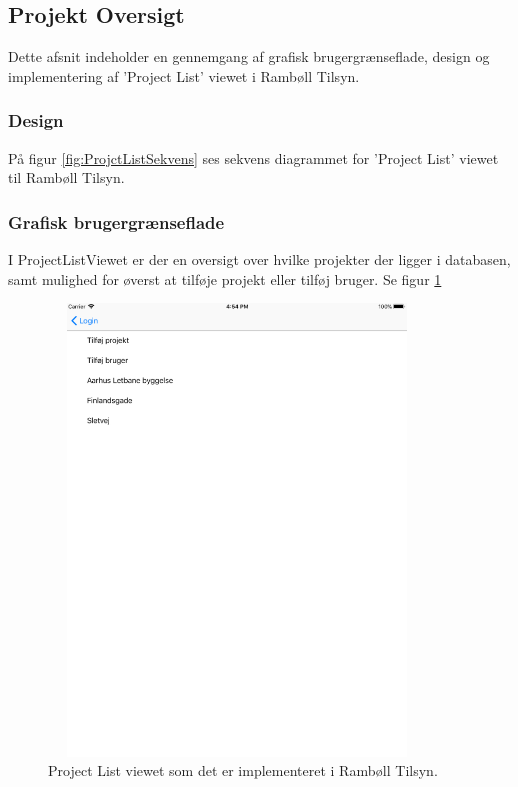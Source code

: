 \subsection{Projekt Oversigt} \label{sec:ProjectList}
Dette afsnit indeholder en gennemgang af grafisk brugergrænseflade, design og implementering af 'Project List' viewet i Rambøll Tilsyn.

\subsubsection{Design}
På figur \ref{fig:ProjctListSekvens} ses sekvens diagrammet for 'Project List' viewet til Rambøll Tilsyn.

\clearpage

\subsubsection{Grafisk brugergrænseflade}
I ProjectListViewet er der en oversigt over hvilke projekter der ligger i databasen, samt mulighed for øverst at tilføje projekt eller tilføj bruger. Se figur \ref{fig:ProjectListView}
\begin{figure}[H] %
	\centering
	\includegraphics[height=12cm, width=10cm]{../ArkitekturDesign/Design/ProjectList/ProjectList}
	\caption{Project List viewet som det er implementeret i Rambøll Tilsyn.}
	\label{fig:ProjectListView}
\end{figure}

